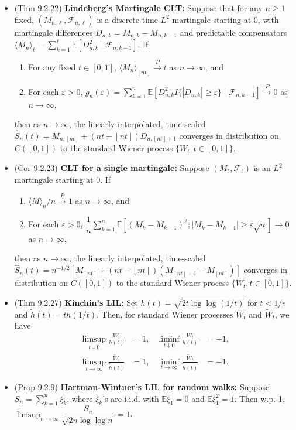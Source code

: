 \documentclass[twoside]{article}
\newcommand{\dis}{\displaystyle}
\def\lf{\left\lfloor}
\def\rf{\right\rfloor}
\newcommand\bbE{\mathbb{E}}
\newcommand\calF{\mathcal{F}}
\def\eps{\varepsilon}
\newcommand\goesto{\rightarrow}
\begin{document}
\begin{itemize}
\item (Thm 9.2.22) \textbf{Lindeberg's Martingale CLT:} Suppose that for any $n \geq 1$ fixed, $(M_{n,\ell}, \calF_{n, \ell})$ is a discrete-time $L^2$ martingale starting at 0, with martingale differences $D_{n,k} = M_{n,k} - M_{n, k-1}$ and predictable compensators $\langle M_n \rangle_\ell = \dis\sum_{k=1}^\ell \bbE [D_{n,k}^2 \mid \calF_{n, k-1}]$. If
\begin{enumerate}[label=(\alph*)]
\item For any fixed $t \in [0,1]$, $\langle M_n \rangle_{\lf nt \rf} \stackrel{P}{\goesto} t$ as $n \goesto \infty$, and
\item For each $\eps > 0$, $g_n(\eps) = \dis\sum_{k=1}^n \bbE [D_{n,k}^2 I \{ |D_{n,k}| \geq \eps\} \mid \calF_{n,k-1}] \stackrel{P}{\goesto} 0$ as $n \goesto \infty$,
\end{enumerate}
then as $n \goesto \infty$, the linearly interpolated, time-scaled $\widehat{S}_n(t) = M_{n,\lf nt \rf} + (nt - \lf nt \rf)D_{n, \lf nt \rf + 1}$ converges in distribution on $C([0,1])$ to the standard Wiener process $\{ W_t, t \in [0,1]\}$.

\item (Cor 9.2.23) \textbf{CLT for a single martingale:} Suppose $(M_\ell, \calF_\ell)$ is an $L^2$ martingale starting at 0. If
\begin{enumerate}[label=(\alph*)]
\item $\langle M \rangle_n / n \stackrel{P}{\goesto} 1$ as $n \goesto \infty$, and
\item For each $\eps > 0$, $\dfrac{1}{n}\dis\sum_{k=1}^n \bbE [(M_k - M_{k-1})^2; |M_k - M_{k-1}| \geq \eps\sqrt{n}] \goesto 0$ as $n \goesto \infty$,
\end{enumerate}
then as $n \goesto \infty$, the linearly interpolated, time-scaled $\widehat{S}_n(t) = n^{-1/2}[M_{\lf nt \rf} + (nt - \lf nt \rf)(M_{\lf nt \rf + 1} - M_{\lf nt \rf})]$ converges in distribution on $C([0,1])$ to the standard Wiener process $\{ W_t, t \in [0,1]\}$.

\item (Thm 9.2.27) \textbf{Kinchin's LIL:} Set $h(t) = \sqrt{2t \log \log (1/t)}$ for $t < 1/e$ and $\tilde{h}(t) = th(1/t)$. Then, for standard Wiener processes $W_t$ and $\widetilde{W}_t$, we have
\begin{align*}
\limsup_{t \downarrow 0} \frac{W_t}{h(t)} &= 1, &\liminf_{t \downarrow 0} \frac{W_t}{h(t)} &= -1, \\ 
\limsup_{t \goesto \infty} \frac{\widetilde{W}_t}{\tilde{h}(t)} &= 1, &\liminf_{t \goesto \infty} \frac{\widetilde{W}_t}{\tilde{h}(t)} &= -1.
\end{align*}

\item (Prop 9.2.9) \textbf{Hartman-Wintner's LIL for random walks:} Suppose $S_n = \sum_{k=1}^n \xi_k$, where $\xi_k$'s are i.i.d. with $\bbE \xi_1 = 0$ and $\bbE \xi_1^2 = 1$. Then w.p. 1, $\dis\limsup_{n \goesto \infty} \dfrac{S_n}{\sqrt{2n \log \log n}} = 1$.

\end{itemize}
\end{document}
